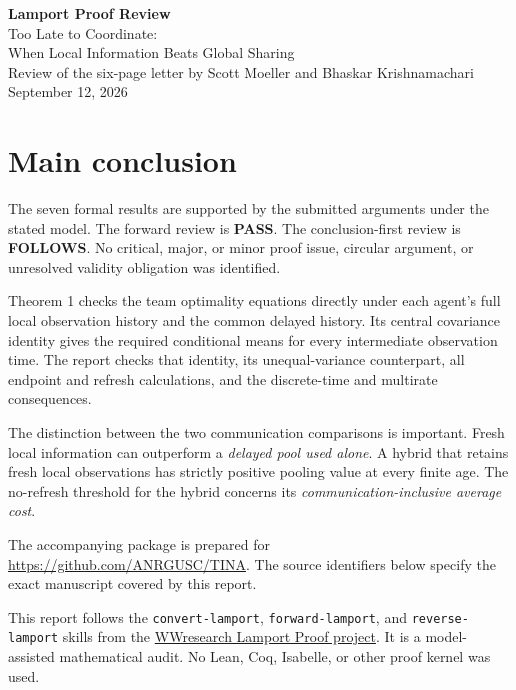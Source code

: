 \documentclass[11pt,letterpaper]{article}
\begin{document}
\begin{center}
{\Large\bfseries\textcolor{ink}{Lamport Proof Review}}\\[8pt]
{\large Too Late to Coordinate:\\
When Local Information Beats Global Sharing}\\[10pt]
{\normalsize Review of the six-page letter by Scott Moeller and Bhaskar Krishnamachari}\\[5pt]
September 12, 2026
\end{center}

\section*{Main conclusion}
The seven formal results are supported by the submitted arguments under the stated model. The forward review is \textbf{PASS}. The conclusion-first review is \textbf{FOLLOWS}. No critical, major, or minor proof issue, circular argument, or unresolved validity obligation was identified.

Theorem 1 checks the team optimality equations directly under each agent's full local observation history and the common delayed history. Its central covariance identity gives the required conditional means for every intermediate observation time. The report checks that identity, its unequal-variance counterpart, all endpoint and refresh calculations, and the discrete-time and multirate consequences.

The distinction between the two communication comparisons is important. Fresh local information can outperform a \emph{delayed pool used alone}. A hybrid that retains fresh local observations has strictly positive pooling value at every finite age. The no-refresh threshold for the hybrid concerns its \emph{communication-inclusive average cost}.

The accompanying package is prepared for \url{https://github.com/ANRGUSC/TINA}. The source identifiers below specify the exact manuscript covered by this report.

This report follows the \texttt{convert-lamport}, \texttt{forward-lamport}, and \texttt{reverse-lamport} skills from the \href{https://github.com/WWresearch/lamport-proof}{WWresearch Lamport Proof project}. It is a model-assisted mathematical audit. No Lean, Coq, Isabelle, or other proof kernel was used.
\end{document}
